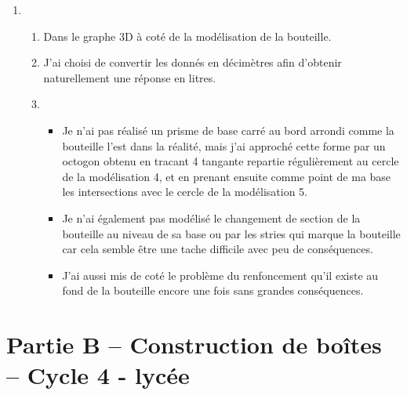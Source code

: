 \begin{enumerate}[label=\textbf{\color{red}\alph*.}]
    \item \begin{enumerate}[label=\textbf{\color{red}\roman*.}]
        \item Dans le graphe 3D à coté de la modélisation de la bouteille.
        \item J'ai choisi de convertir les donnés en décimètres afin d'obtenir naturellement une réponse en litres.
        \item 
        \begin{itemize}[wide, labelwidth=!, labelindent=0pt] 
            \item Je n'ai pas réalisé un prisme de base carré au bord arrondi comme la bouteille l'est dans la réalité,
            mais j'ai approché cette forme par un octogon obtenu en tracant 4 tangante repartie régulièrement au cercle de la modélisation 4,
            et en prenant ensuite comme point de ma base les intersections avec le cercle de la modélisation 5.
            \item Je n'ai également pas modélisé le changement de section de la bouteille au niveau de sa base ou par les stries qui marque la bouteille car cela semble être une tache difficile avec peu de conséquences.
            \item J'ai aussi mis de coté le problème du renfoncement qu'il existe au fond de la bouteille encore une fois sans grandes conséquences.
        \end{itemize}
    \end{enumerate}
\end{enumerate}

\newpage
\section*{Partie B – Construction de boîtes – Cycle 4 - lycée}

